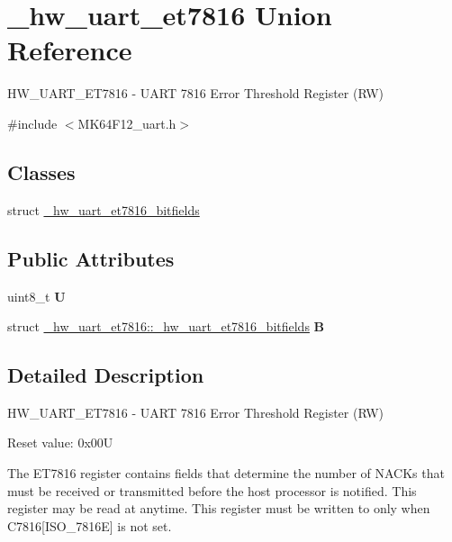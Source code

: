 \hypertarget{union__hw__uart__et7816}{}\section{\+\_\+hw\+\_\+uart\+\_\+et7816 Union Reference}
\label{union__hw__uart__et7816}


H\+W\+\_\+\+U\+A\+R\+T\+\_\+\+E\+T7816 -\/ U\+A\+RT 7816 Error Threshold Register (RW)  




{\ttfamily \#include $<$M\+K64\+F12\+\_\+uart.\+h$>$}

\subsection*{Classes}
\begin{DoxyCompactItemize}
\item 
struct \hyperlink{struct__hw__uart__et7816_1_1__hw__uart__et7816__bitfields}{\+\_\+hw\+\_\+uart\+\_\+et7816\+\_\+bitfields}
\end{DoxyCompactItemize}
\subsection*{Public Attributes}
\begin{DoxyCompactItemize}
\item 
uint8\+\_\+t {\bfseries U}\hypertarget{union__hw__uart__et7816_afe4e2f9901cac0be2ac854404c972a2a}{}\label{union__hw__uart__et7816_afe4e2f9901cac0be2ac854404c972a2a}

\item 
struct \hyperlink{struct__hw__uart__et7816_1_1__hw__uart__et7816__bitfields}{\+\_\+hw\+\_\+uart\+\_\+et7816\+::\+\_\+hw\+\_\+uart\+\_\+et7816\+\_\+bitfields} {\bfseries B}\hypertarget{union__hw__uart__et7816_a99e3a8632aca6315cdbeabed6ddbcb56}{}\label{union__hw__uart__et7816_a99e3a8632aca6315cdbeabed6ddbcb56}

\end{DoxyCompactItemize}


\subsection{Detailed Description}
H\+W\+\_\+\+U\+A\+R\+T\+\_\+\+E\+T7816 -\/ U\+A\+RT 7816 Error Threshold Register (RW) 

Reset value\+: 0x00U

The E\+T7816 register contains fields that determine the number of N\+A\+C\+Ks that must be received or transmitted before the host processor is notified. This register may be read at anytime. This register must be written to only when C7816\mbox{[}I\+S\+O\+\_\+7816E\mbox{]} is not set. 

